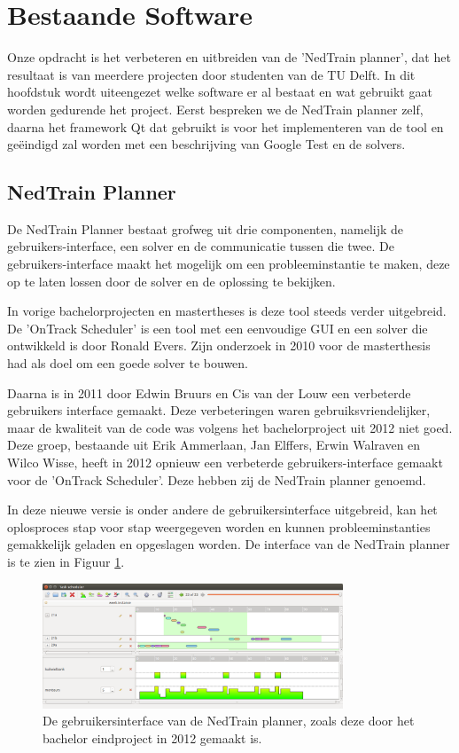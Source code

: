 \section{Bestaande Software}
Onze opdracht is het verbeteren en uitbreiden van de 'NedTrain planner', dat het resultaat is van meerdere projecten door studenten van de TU Delft. In dit hoofdstuk wordt uiteengezet welke software er al bestaat en wat gebruikt gaat worden gedurende het project. Eerst bespreken we de NedTrain planner zelf, daarna het framework Qt dat gebruikt is voor het implementeren van de tool en ge\"eindigd zal worden met een beschrijving van Google Test en de solvers.

\subsection{NedTrain Planner}
\label{subsec:planner}
De NedTrain Planner bestaat grofweg uit drie componenten, namelijk de gebruikers-interface, een solver en de communicatie tussen die twee. De gebruikers-interface maakt het mogelijk om een probleeminstantie te maken, deze op te laten lossen door de solver en de oplossing te bekijken.

In vorige bachelorprojecten en mastertheses is deze tool steeds verder uitgebreid. De 'OnTrack Scheduler' is een tool met een eenvoudige GUI en een solver die ontwikkeld is door Ronald Evers. Zijn onderzoek in 2010 voor de masterthesis had als doel om een goede solver te bouwen. \cite{ronaldevers2010}

Daarna is in 2011 door Edwin Bruurs en Cis van der Louw een verbeterde gebruikers interface gemaakt. \cite{bep2011nedtrain} Deze verbeteringen waren gebruiksvriendelijker, maar de kwaliteit van de code was volgens het bachelorproject uit 2012 niet goed. \cite{bep2012nedtrain} Deze groep, bestaande uit Erik Ammerlaan, Jan Elffers, Erwin Walraven en Wilco Wisse, heeft in 2012 opnieuw een verbeterde gebruikers-interface gemaakt voor de 'OnTrack Scheduler'. Deze hebben zij de NedTrain planner genoemd.

In deze nieuwe versie is onder andere de gebruikersinterface uitgebreid, kan het oplosproces stap voor stap weergegeven worden en kunnen probleeminstanties gemakkelijk geladen en opgeslagen worden. De interface van de NedTrain planner is te zien in Figuur \ref{fig:plannergui}.

\begin{figure}[!h]
\label{fig:plannergui}
\centering
\includegraphics[width=0.8\textwidth]{../images/plannergui.png}
\caption{De gebruikersinterface van de NedTrain planner, zoals deze door het bachelor eindproject in 2012 gemaakt is.}
\end{figure}

